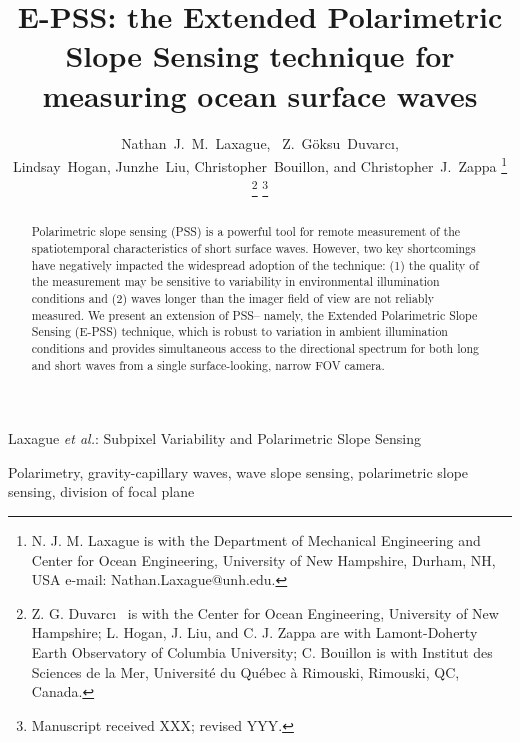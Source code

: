 \documentclass[letterpaper,journal]{IEEEtran}
\begin{document}
%
\title{E-PSS: the Extended Polarimetric Slope Sensing technique for measuring ocean surface waves}

\author{Nathan~J.~M.~Laxague,~
        Z.~G\"oksu~Duvarc\i,\\
        Lindsay~Hogan, Junzhe~Liu,
        Christopher~Bouillon, and Christopher~J.~Zappa%
\thanks{N. J. M. Laxague is with the Department
of Mechanical Engineering and Center for Ocean Engineering, University of New Hampshire, Durham, NH, USA e-mail: Nathan.Laxague@unh.edu.}%
\thanks{Z. G. Duvarc\i~ is with the Center for Ocean Engineering, University of New Hampshire; L. Hogan, J. Liu, and C. J. Zappa are with Lamont-Doherty Earth Observatory of Columbia University; C. Bouillon is with Institut des Sciences de la Mer, Université du Québec à Rimouski, Rimouski, QC, Canada.}%
\thanks{Manuscript received XXX; revised YYY.}}

%
{Laxague \MakeLowercase{\textit{et al.}}: Subpixel Variability and Polarimetric Slope Sensing}

\maketitle

\begin{abstract}
Polarimetric slope sensing (PSS) is a powerful tool for remote measurement of the spatiotemporal characteristics of short surface waves. However, two key shortcomings have negatively impacted the widespread adoption of the technique: (1) the quality of the measurement may be sensitive to variability in environmental illumination conditions and (2) waves longer than the imager field of view are not reliably measured. We present an extension of PSS-- namely, the Extended Polarimetric Slope Sensing (E-PSS) technique, which is robust to variation in ambient illumination conditions and provides simultaneous access to the directional spectrum for both long and short waves from a single surface-looking, narrow FOV camera. 
\end{abstract}

\begin{IEEEkeywords}
Polarimetry, gravity-capillary waves, wave slope sensing, polarimetric slope sensing, division of focal plane
\end{IEEEkeywords}
\end{document}
